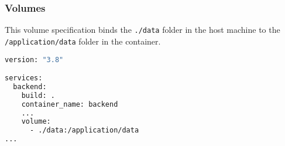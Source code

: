 \documentclass{article}
\begin{document}
\subsubsection{Volumes}
This volume specification binds the \verb|./data| folder in the host machine to the \verb|/application/data| folder in the container. \\

\begin{lstlisting}[language=bash,breaklines=true,label={code:compose}]
version: "3.8"

services:
  backend:
    build: .
    container_name: backend
    ...
    volume:
      - ./data:/application/data
...
\end{lstlisting}
\end{document}
